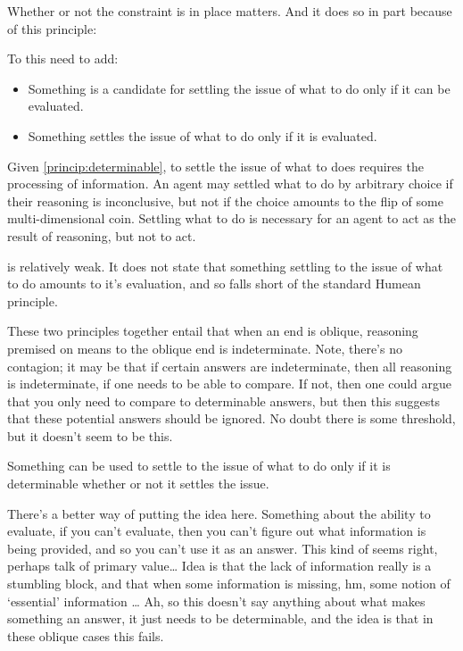 \documentclass[10pt]{article}
\begin{document}
Whether or not the constraint is in place matters.
And it does so in part because of this principle:

To this need to add:
\begin{principle}\label{princip:determinable}
  \begin{itemize}
  \item Something is a candidate for settling the issue of what to do only if it can be evaluated.
  \item Something settles the issue of what to do only if it is evaluated.
  \end{itemize}

\end{principle}
Given \autoref{princip:determinable}, to settle the issue of what to does requires the processing of information.
An agent may settled what to do by arbitrary choice if their reasoning is inconclusive, but not if the choice amounts to the flip of some multi-dimensional coin.
Settling what to do is necessary for an agent to act as the result of reasoning, but not to act.


is relatively weak.
It does not state that something settling to the issue of what to do amounts to it's evaluation, and so falls short of the standard Humean principle.



These two principles together entail that when an end is oblique, reasoning premised on means to the oblique end is indeterminate.
Note, there's no contagion; it may be that if certain answers are indeterminate, then all reasoning is indeterminate, if one needs to be able to compare.
If not, then one could argue that you only need to compare to determinable answers, but then this suggests that these potential answers should be ignored.
No doubt there is some threshold, but it doesn't seem to be this.

\begin{principle}
  Something can be used to settle to the issue of what to do only if it is determinable whether or not it settles the issue.
\end{principle}
There's a better way of putting the idea here.
Something about the ability to evaluate, if you can't evaluate, then you can't figure out what information is being provided, and so you can't use it as an answer.
This kind of seems right, perhaps talk of primary value\dots
Idea is that the lack of information really is a stumbling block, and that when some information is missing, hm, some notion of `essential' information \dots
Ah, so this doesn't say anything about what makes something an answer, it just needs to be determinable, and the idea is that in these oblique cases this fails.
\end{document}
